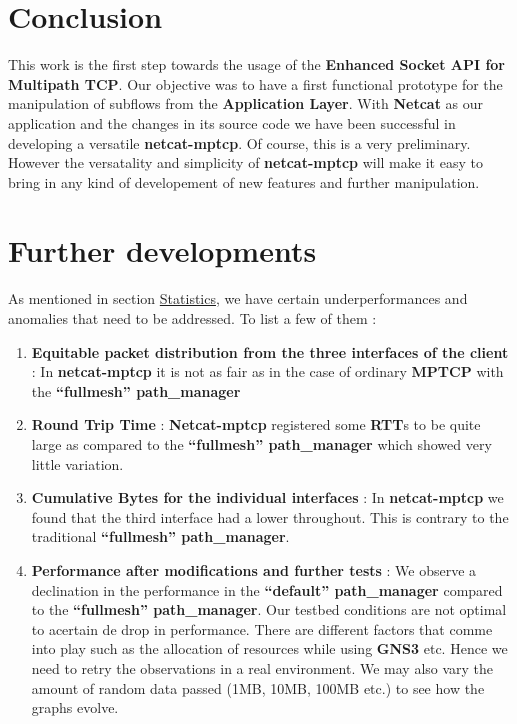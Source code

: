 \documentclass[a4paper,11pt]{article}
\begin{document}
	\clearpage
	\section{Conclusion}
		\label{sec:conclusion}
	 	This work is the first step towards the usage of the \textbf{Enhanced Socket API for Multipath TCP}. Our objective was to have a first functional prototype for the manipulation of subflows from the \textbf{Application Layer}. With \textbf{Netcat} as our application and the changes in its source code we have been successful in developing a versatile \textbf{netcat-mptcp}. Of course, this is a very preliminary. However the versatality and simplicity of \textbf{netcat-mptcp} will make it easy to bring in any kind of developement of new features and further manipulation.
		 	
		 
	\section{Further developments}
		\label{sec:furtherdevelopment}
		As mentioned in section \hyperref[subsec:statistics]{Statistics}, we have certain underperformances and anomalies that need to be addressed. To list a few of them :

		\begin{enumerate}
			\item \textbf{Equitable packet distribution from the three interfaces of the client} : In \textbf{netcat-mptcp} it is not as fair as in the case of ordinary \textbf{MPTCP} with the \textbf{``fullmesh'' path\_manager}
			\item \textbf{Round Trip Time} : \textbf{Netcat-mptcp} registered some \textbf{RTT}s to be quite large as compared to the \textbf{``fullmesh'' path\_manager} which showed very little variation.
			\item \textbf{Cumulative Bytes for the individual interfaces} : In \textbf{netcat-mptcp} we found that the third interface had a lower throughout. This is contrary to the traditional \textbf{``fullmesh'' path\_manager}.
			\item \textbf{Performance after modifications and further tests} : We observe a declination in the performance in the \textbf{``default'' path\_manager} compared to the \textbf{``fullmesh'' path\_manager}. Our testbed conditions are not optimal to acertain de drop in performance. There are different factors that comme into play such as the allocation of resources while using \textbf{GNS3} etc. Hence we need to retry the observations in a real environment. We may also vary the amount of random data passed (1MB, 10MB, 100MB etc.) to see how the graphs evolve.
		\end{enumerate}
\end{document}
